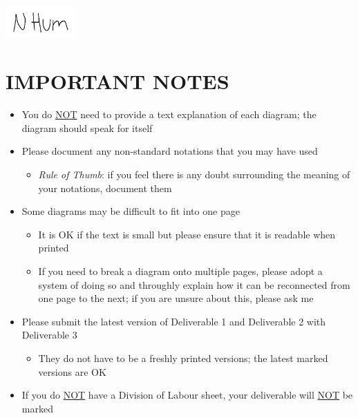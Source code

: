 \documentclass[]{article}
\numberwithin{figure}{section}
\begin{document}
\includegraphics[width=0.2\textwidth]{signatures/NathanHumSignature.png} %

\clearpage
\section*{IMPORTANT NOTES}
\begin{itemize}
	\item You do \underline{NOT} need to provide a text explanation of each diagram; the diagram should speak for itself
	\item Please document any non-standard notations that you may have used
	\begin{itemize}
		\item \emph{Rule of Thumb}: if you feel there is any doubt surrounding the meaning of your notations, document them
	\end{itemize}
	\item Some diagrams may be difficult to fit into one page
	\begin{itemize}
		\item It is OK if the text is small but please ensure that it is readable when printed
		\item If you need to break a diagram onto multiple pages, please adopt a system of doing so and throughly explain how it can be reconnected from one page to the next; if you are unsure about this, please ask me
	\end{itemize}
	\item Please submit the latest version of Deliverable 1 and Deliverable 2 with Deliverable 3
	\begin{itemize}
		\item They do not have to be a freshly printed versions; the latest marked versions are OK
	\end{itemize}
	\item If you do \underline{NOT} have a Division of Labour sheet, your deliverable will \underline{NOT} be marked
\end{itemize}
\end{document}

